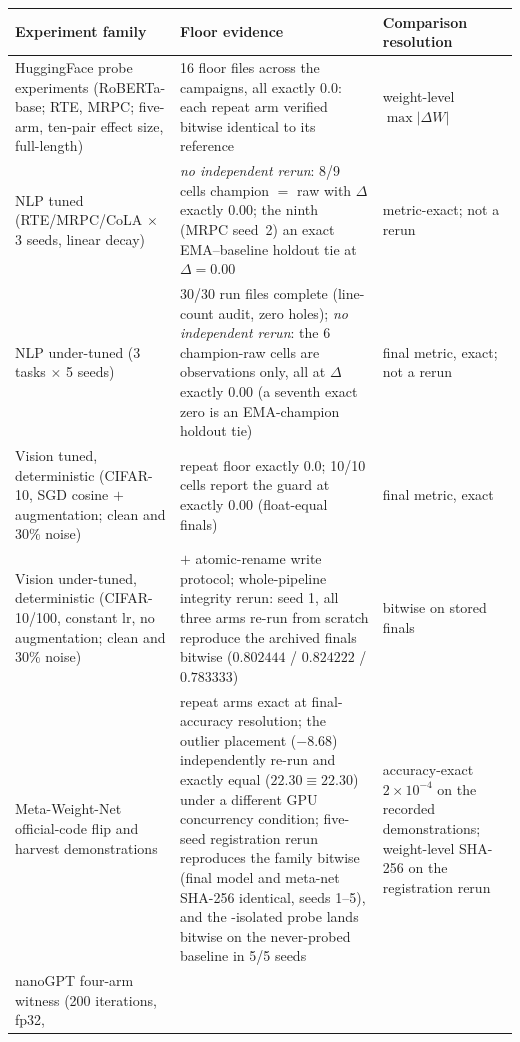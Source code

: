 \begin{table}[tbp]
\centering
\footnotesize
\setlength{\tabcolsep}{5pt}
\begin{tabular}{@{}L{4.4cm}L{7.6cm}L{3.2cm}@{}}
\toprule
Experiment family & Floor evidence & Comparison resolution \\
\midrule
HuggingFace probe experiments (RoBERTa-base; RTE, MRPC; five-arm,
ten-pair effect size, full-length) &
16 floor files across the campaigns, all exactly $0.0$: each repeat arm
verified bitwise identical to its reference &
weight-level $\max|\Delta W|$ \\
\addlinespace
NLP tuned (RTE/MRPC/CoLA $\times$ 3 seeds, linear decay) &
\emph{no independent rerun}: 8/9 cells champion $=$ raw with $\Delta$
exactly $0.00$;
the ninth (MRPC seed~2) an exact EMA--baseline holdout tie at
$\Delta = 0.00$ &
metric-exact; not a rerun \\
\addlinespace
NLP under-tuned (3 tasks $\times$ 5 seeds) &
30/30 run files complete (line-count audit, zero holes); \emph{no
independent rerun}: the 6 champion-raw cells are observations only, all at
$\Delta$ exactly $0.00$
(a seventh exact zero is an EMA-champion holdout tie) &
final metric, exact; not a rerun \\
\addlinespace
Vision tuned, deterministic (CIFAR-10, SGD cosine $+$ augmentation;
clean and 30\% noise) &
repeat floor exactly $0.0$; 10/10 cells report the guard at exactly
$0.00$ (float-equal finals) &
final metric, exact \\
\addlinespace
Vision under-tuned, deterministic (CIFAR-10/100, constant lr, no
augmentation; clean and 30\% noise) &
 $+$ atomic-rename write protocol; whole-pipeline integrity
rerun: seed 1, all three arms re-run from scratch reproduce the archived
finals bitwise ($0.802444$ / $0.824222$ / $0.783333$) &
bitwise on stored finals \\
\addlinespace
Meta-Weight-Net official-code flip and harvest demonstrations &
repeat arms exact at final-accuracy resolution; the outlier placement
($-8.68$) independently re-run and exactly equal ($22.30 \equiv 22.30$)
under a different GPU concurrency condition; five-seed registration
rerun reproduces the family bitwise (final model and meta-net SHA-256
identical, seeds 1--5), and the -isolated probe lands
bitwise on the never-probed baseline in 5/5 seeds &
accuracy-exact $2{\times}10^{-4}$ on the recorded demonstrations;
weight-level SHA-256 on the registration rerun \\
\addlinespace
nanoGPT four-arm witness (200 iterations, fp32,

\end{tabular}
\end{table}

